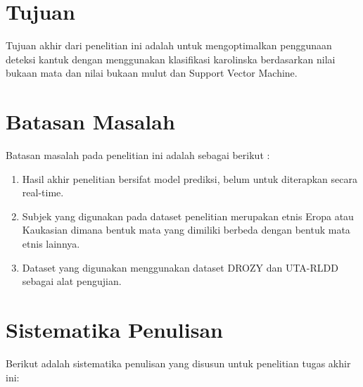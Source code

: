\section{Tujuan}
\label{sec:Tujuan}

Tujuan akhir dari penelitian ini adalah untuk mengoptimalkan penggunaan deteksi kantuk dengan menggunakan klasifikasi karolinska berdasarkan nilai bukaan mata dan nilai bukaan mulut dan Support Vector Machine.

\section{Batasan Masalah}
\label{sec:batasanmasalah} 
Batasan masalah pada penelitian ini adalah sebagai berikut :

\begin{enumerate}
  \item Hasil akhir penelitian bersifat model prediksi, belum untuk diterapkan secara real-time.


  \item Subjek yang digunakan pada dataset penelitian merupakan etnis Eropa atau Kaukasian dimana bentuk mata yang dimiliki berbeda dengan bentuk mata etnis lainnya.


  \item Dataset yang digunakan menggunakan dataset DROZY dan UTA-RLDD sebagai alat pengujian.

\end{enumerate}

\section{Sistematika Penulisan}
\label{sec:sistematikapenulisan}

Berikut adalah sistematika penulisan yang disusun untuk penelitian tugas akhir ini:

